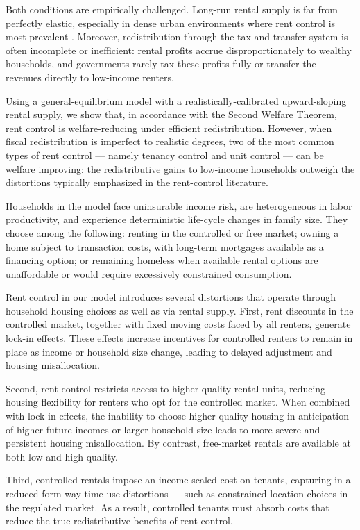 \documentclass[parskip=full]{article}
\begin{document}
Both conditions are empirically challenged. Long-run rental supply is far from perfectly elastic, especially in dense urban environments where rent control is most prevalent \citep{orr-1968,cy-1994,susin-2002,fack-2006,sy-2020,rs-2023}. Moreover, redistribution through the tax-and-transfer system is often incomplete or inefficient: rental profits accrue disproportionately to wealthy households, and governments rarely tax these profits fully or transfer the revenues directly to low-income renters.

Using a general-equilibrium model with a realistically-calibrated upward-sloping rental supply, we show that, in accordance with the Second Welfare Theorem, rent control is welfare-reducing under efficient redistribution. However, when fiscal redistribution is imperfect to realistic degrees, two of the most common types of rent control — namely tenancy control and unit control — can be welfare improving: the redistributive gains to low-income households outweigh the distortions typically emphasized in the rent-control literature.

Households in the model face uninsurable income risk, are heterogeneous in labor productivity, and experience deterministic life-cycle changes in family size. They choose among the following: renting in the controlled or free market; owning a home subject to transaction costs, with long-term mortgages available as a financing option; or remaining homeless when available rental options are unaffordable or would require excessively constrained consumption.

Rent control in our model introduces several distortions that operate through household housing choices as well as via rental supply. First, rent discounts in the controlled market, together with fixed moving costs faced by all renters, generate lock-in effects. These effects increase incentives for controlled renters to remain in place as income or household size change, leading to delayed adjustment and housing misallocation.

Second, rent control restricts access to higher-quality rental units, reducing housing flexibility for renters who opt for the controlled market. When combined with lock-in effects, the inability to choose higher-quality housing in anticipation of higher future incomes or larger household size leads to more severe and persistent housing misallocation. By contrast, free-market rentals are available at both low and high quality.

Third, controlled rentals impose an income-scaled cost on tenants, capturing in a reduced-form way time-use distortions — such as constrained location choices in the regulated market. As a result, controlled tenants must absorb costs that reduce the true redistributive benefits of rent control.
\end{document}
